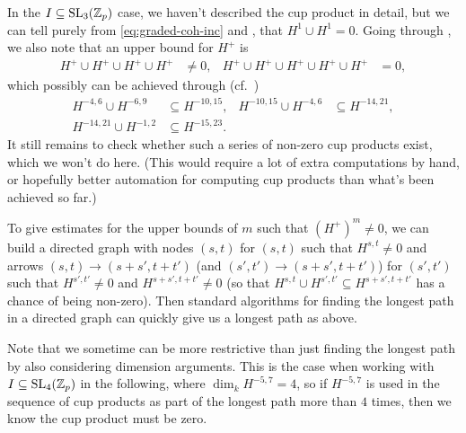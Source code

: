 In the $I \subseteq \operatorname{SL}_{3}(\mathbb{Z}_{p})$ case, we haven't described the cup product in detail, but we can tell purely from \eqref{eq:graded-coh-inc} and , that $H^{1} \cup H^{1} = 0$. Going through , we also note that an upper bound for $H^{+}$ is
\begin{align*}
  H^{+} \cup H^{+} \cup H^{+} \cup H^{+} &\neq 0, & H^{+} \cup H^{+} \cup H^{+} \cup H^{+} \cup H^{+} &= 0,
\end{align*}
which possibly can be achieved through (cf.\ \cite{code})
\begin{align*}
  H^{-4,6} \cup H^{-6,9} &\subseteq H^{-10,15}, & H^{-10,15} \cup H^{-4,6} &\subseteq H^{-14,21}, \\
  H^{-14,21} \cup H^{-1,2} &\subseteq H^{-15,23}.
\end{align*}
It still remains to check whether such a series of non-zero cup products exist, which we won't do here. (This would require a lot of extra computations by hand, or hopefully better automation for computing cup products than what's been achieved so far.)

\begin{remark}
  To give estimates for the upper bounds of $m$ such that $(H^{+})^{m} \neq 0$, we can build a directed graph with nodes $(s,t)$ for $(s,t)$ such that $H^{s,t} \neq 0$ and arrows $(s,t) \to (s+s',t+t')$ (and $(s',t') \to (s+s',t+t')$) for $(s',t')$ such that $H^{s',t'} \neq 0$ and $H^{s+s',t+t'} \neq 0$ (so that $H^{s,t} \cup H^{s',t'} \subseteq H^{s+s',t+t'}$ has a chance of being non-zero). Then standard algorithms for finding the longest path in a directed graph can quickly give us a longest path as above.

  Note that we sometime can be more restrictive than just finding the longest path by also considering dimension arguments. This is the case when working with $I \subseteq \operatorname{SL}_{4}(\mathbb{Z}_{p})$ in the following, where $\dim_{k} H^{-5,7} = 4$, so if $H^{-5,7}$ is used in the sequence of cup products as part of the longest path more than $4$ times, then we know the cup product must be zero.
\end{remark}

